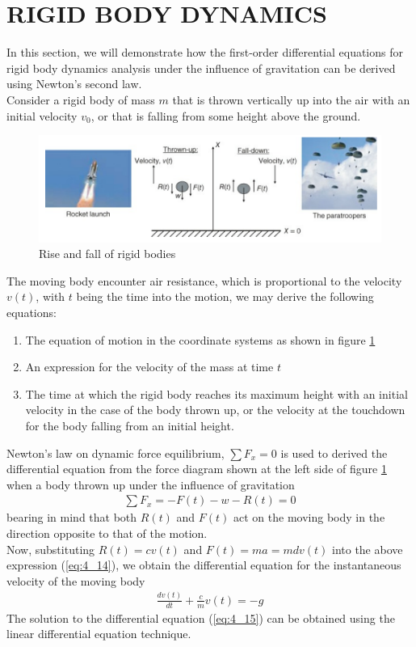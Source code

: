 \documentclass[11pt]{report}
\newcommand{\sps}{\\[0.2cm]}
\newcommand{\refn}[1]{(\ref{#1})}
\newcommand{\refx}[1]{\refn{eq:#1}}
\newcommand{\NI}{\noindent}
\renewcommand{\labelenumi}{\arabic{enumi})}
\begin{document}
	\section{RIGID BODY DYNAMICS}
	In this section, we will demonstrate how the first-order differential equations for rigid body dynamics analysis under the influence of gravitation can be derived using Newton's second law.\\
	
	\NI Consider a rigid body of mass $m$ that is thrown vertically up into the air with an initial velocity $v_0$, or that is falling from some height above the ground. 
	\begin{figure}[h!]
		\centering
		\includegraphics[width=0.9\linewidth]{rigid}
		\caption{Rise and fall of rigid bodies}
		\label{fig:4_2}
	\end{figure}
	The moving body encounter air resistance, which is proportional to the velocity $v(t)$, with $t$ being the time into the motion, we may derive the following equations:
	\begin{enumerate}
		\renewcommand{\labelenumi}{\alph{enumi}}
		\item The equation of motion in the coordinate systems as shown in figure \ref{fig:4_2}
		\item An expression for the velocity of the mass at time $t$
		\item The time at which the rigid body reaches its maximum height with an initial velocity in the case of the body thrown up, or the velocity at the touchdown for the body falling from an initial height.
	\end{enumerate}
	Newton's law on dynamic force equilibrium, $\sum F_x = 0$ is used to derived the differential equation from the force diagram shown at the left side of figure \ref{fig:4_2} when a body thrown up under the influence of gravitation
	\begin{eqnarray}
		\sum F_x = -F(t) - w - R(t) = 0\label{eq:4_14}
	\end{eqnarray}
	bearing in mind that both $R(t)$ and $F(t)$ act on the moving body in the direction opposite to that of the motion.\sps
	Now, substituting $R(t) = cv(t)$ and $F(t)=ma=mdv(t)$ into the above expression \refx{4_14}, we obtain the differential equation for the instantaneous velocity of the moving body
	\begin{eqnarray}
		\frac{dv(t)}{dt} + \frac{c}{m}v(t) = -g\label{eq:4_15}
	\end{eqnarray}
	The solution to the differential equation \refx{4_15} can be obtained using the linear differential equation technique.
	
\end{document}

